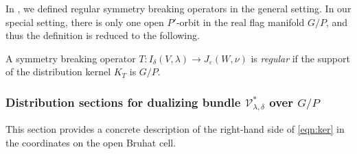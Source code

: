 \vskip 0.8pc
In \cite[Def.~3.3]{sbon}, 
 we defined regular symmetry breaking operators
 in the general setting.  
In our special setting,
 there is only one open $P'$-orbit 
 in the real flag manifold $G/P$,
 and thus the definition is reduced to the following.  
\begin{definition}
\label{def:regSBO}
A symmetry breaking operator
 $T \colon I_{\delta}(V,\lambda) \to J_{\varepsilon}(W,\nu)$
 is 
{\it{regular}} 
 if the support of the distribution kernel $K_T$ is $G/P$.  
\end{definition}

\subsubsection{Distribution sections for dualizing bundle
 ${\mathcal{V}}_{\lambda,\delta}^{\ast}$ over $G/P$}
\label{subsec:GPsec}
This section provides a concrete description
 of the right-hand side of \eqref{eqn:ker}
 in the coordinates on the open 
Bruhat cell.  




